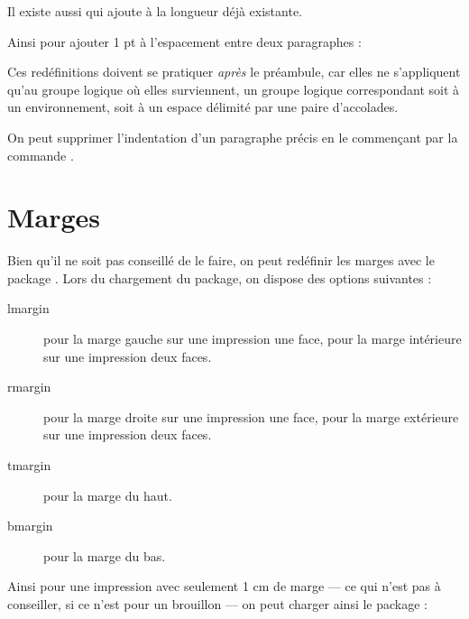 \begin{latexcode}
\setlength{\parindent}{3ex}
\end{latexcode}

Il existe aussi  qui ajoute  à la longueur déjà existante.

Ainsi pour ajouter 1 pt à l'espacement entre deux paragraphes :

\begin{latexcode}
\addtolength{\parskip}{1pt}
\end{latexcode}

Ces redéfinitions doivent se pratiquer \emph{après} le préambule, car elles ne s'appliquent qu'au groupe logique où elles surviennent, un groupe logique correspondant soit à un environnement, soit à un espace délimité par une paire d'accolades.

\begin{plusloins}
On peut supprimer l'indentation d'un paragraphe précis en le commençant par la commande .
\end{plusloins}

\section{Marges}

Bien qu'il ne soit pas conseillé de le faire, on peut redéfinir les marges avec le package . Lors du chargement du package, on dispose des options suivantes :
\begin{description}
\item[lmargin]pour la marge gauche sur une impression une face, pour la marge intérieure sur une impression deux faces.
\item[rmargin]pour la marge droite sur une impression une face, pour la marge extérieure sur une impression deux faces.
\item[tmargin]pour la marge du haut.
\item[bmargin]pour la marge du bas.
\end{description}

Ainsi pour une impression avec seulement 1 cm de marge --- ce qui n'est pas à conseiller, si ce n'est pour un brouillon --- on peut charger ainsi le package :

\begin{latexcode}
\usepackage[lmargin=1cm,rmargin=1cm,tmargin=1cm,bmargin=1cm]{geometry}
\end{latexcode}

